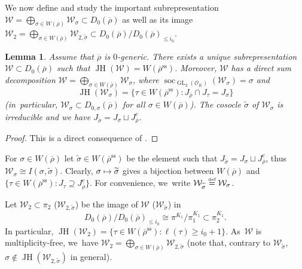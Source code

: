 \documentclass[JEP,XML,SOM,Unicode,NoFloatCountersInSection, NoEqCountersInSection,published]{cedram}
\newcommand\mto{\mathchoice{\longmapsto}{\mapsto}{\mapsto}{\mapsto}}
\let\wt\widetilde
\newcommand{\defeq}{\stackrel{\textrm{\tiny{\upshape{def}}}}{=}}
\newcommand{\cO}{\mathcal{O}}
\newcommand{\cW}{\mathcal{W}}
\renewcommand{\ss}{\mathrm{ss}}
\newcommand{\rhobar}{\overline{\rho}}
\newcommand{\brho}{\overline{\rho}}
\DeclareMathOperator{\GL}{GL}
\DeclareMathOperator{\JH}{\mathrm{JH}}
\DeclareMathOperator{\soc}{soc}
\theoremstyle{plain}
\newtheorem{lem}[prop]{Lemma}
\theoremstyle{definition}
\begin{document}
We now define and study the important subrepresentation $\cW=\bigoplus_{\sigma\in W(\brho)}\mathcal{W}_{\sigma} \subset D_0(\brho)$ as well as its image $\cW_2=\bigoplus_{\sigma \in W(\brho)}\mathcal{W}_{2,\wt{\sigma}} \subset D_0(\brho)/D_{0}(\brho)_{\leq i_0}$.

\begin{lem}\label{lem:calW}
{Assume that $\rhobar$ is $0$-generic.}
There exists a unique subrepresentation $\mathcal{W}\subset D_0(\brho)$ such that $\JH(\mathcal{W})=W(\brho^{\ss})$. Moreover, $\mathcal{W}$ has a direct sum decomposition $\mathcal{W}=\bigoplus_{\sigma\in W(\brho)}\mathcal{W}_{\sigma}$, where $\soc_{\GL_2(\cO_K)}(\mathcal{W}_{\sigma})=\sigma$ and
\[
\JH(\mathcal{W}_{\sigma})=\{\tau\in W(\brho^\ss):J_{\brho}\cap J_{\tau}=J_{\sigma}\}
\]
(in~particular, $\mathcal{W}_{\sigma}\subset D_{0,\sigma}(\brho)$ for all $\sigma\in W(\brho)$). The cosocle $\wt\sigma$ of $\mathcal{W}_{\sigma}$ is irreducible and we have $J_{\wt\sigma} = J_{\sigma}\sqcup J_{\brho}^c$.
\end{lem}

\begin{proof}
This is a direct consequence of \cite[Lem.\,4.1.3]{BHHMS4}.
\end{proof}

For $\sigma\in W(\rhobar)$ let $\wt{\sigma}\in W(\brho^\ss)$ be the element such that $J_{\wt\sigma} = J_{\sigma}\sqcup J_{\brho}^c$, thus $\mathcal{W}_{\sigma} \cong I(\sigma,\wt{\sigma})$. Clearly, $\sigma\mto \wt{\sigma}$ gives a bijection between $W(\brho)$ and $\{\tau\in W(\brho^\ss):J_{\tau}\supseteq J_{\brho}^c\}$. For convenience, we~write $\mathcal{W}_{\wt\sigma}\defeq \cW_{\sigma}$.

Let $\mathcal{W}_2\subset \pi_2$ (\resp $\mathcal{W}_{2,\wt{\sigma}}$) be the image of $\mathcal{W}$ (\resp $\mathcal{W}_{\wt{\sigma}}$) in
\[
D_0(\brho)/D_{0}(\brho)_{\leq i_0} \cong \pi^{K_1}/\pi_1^{K_1} \subset \pi_2^{K_1}.
\]
In particular, $\JH(\cW_2) = \{ \tau\in W(\brho^\ss): \ell(\tau) \ge i_0+1 \}$. As~$\cW$ is multiplicity-free, we~have $\mathcal{W}_2=\bigoplus_{\sigma \in W(\brho)}\mathcal{W}_{2,\wt{\sigma}}$ (note that, contrary to $\mathcal{W}_{\wt{\sigma}}$, $\sigma \notin\JH(\mathcal{W}_{2,\wt{\sigma}})$ in general).
\end{document}
